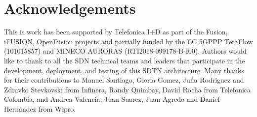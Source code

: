 \documentclass[10pt, conference]{IEEEtran}
\begin{document}

\section*{Acknowledgements}
This is work has been supported by Telefonica I+D as part of the Fusion, i\uppercase{FUSION}, OpenFusion projects and partially funded by the EC 5GPPP TeraFlow (101015857) and MINECO AURORAS (RTI2018-099178-B-I00). Authors would like to thank to all the SDN technical teams and leaders that participate in the development, deployment, and testing of this SDTN architecture. Many thanks for their contributions to Manuel Santiago, Gloria Gomez, Julia Rodriguez and Zdravko Stevkovski from Infinera, Randy Quimbay, David Rocha from Telefonica Colombia, and Andrea Valencia, Juan Suarez, Juan Agredo and Daniel Hernandez from Wipro.   


%


\end{document}
